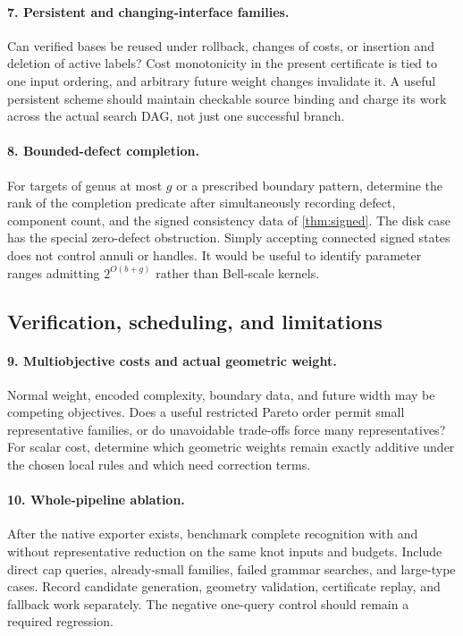 \documentclass[11pt,a4paper]{article}
\theoremstyle{definition}
\theoremstyle{remark}
\begin{document}
\paragraph{7. Persistent and changing-interface families.}
Can verified bases be reused under rollback, changes of costs, or insertion and deletion
of active labels? Cost monotonicity in the present certificate is tied to one input
ordering, and arbitrary future weight changes invalidate it. A useful persistent
scheme should maintain checkable source binding and charge its work across the actual
search DAG, not just one successful branch.

\paragraph{8. Bounded-defect completion.}
For targets of genus at most $g$ or a prescribed boundary pattern, determine the rank
of the completion predicate after simultaneously recording defect, component count,
and the signed consistency data of \cref{thm:signed}. The disk case has the special
zero-defect obstruction. Simply accepting connected signed states does not control
annuli or handles. It would be useful to identify parameter ranges admitting
$2^{O(b+g)}$ rather than Bell-scale kernels.

\subsection{Verification, scheduling, and limitations}
\paragraph{9. Multiobjective costs and actual geometric weight.}
Normal weight, encoded complexity, boundary data, and future width may be competing
objectives. Does a useful restricted Pareto order permit small representative families,
or do unavoidable trade-offs force many representatives? For scalar cost, determine
which geometric weights remain exactly additive under the chosen local rules and
which need correction terms.

\paragraph{10. Whole-pipeline ablation.}
After the native exporter exists, benchmark complete recognition with and without
representative reduction on the same knot inputs and budgets. Include direct cap
queries, already-small families, failed grammar searches, and large-type cases.
Record candidate generation, geometry validation, certificate replay, and fallback
work separately. The negative one-query control should remain a required regression.
\end{document}
